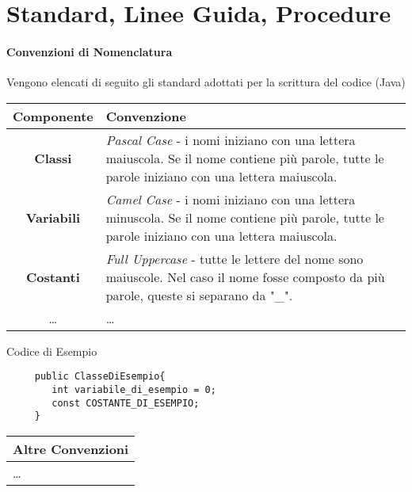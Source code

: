 \documentclass{article}
\begin{document}
\section{Standard, Linee Guida, Procedure}
\paragraph{Convenzioni di Nomenclatura}
Vengono elencati di seguito gli standard adottati per la scrittura del codice (Java)
\begin{center}
    \begin{longtable}{cp{200pt}}
        \toprule
        \textbf{Componente} & \textbf{Convenzione} \\
        \midrule
        \textbf{Classi} & \textit{Pascal Case} -  i nomi iniziano con una lettera maiuscola. Se il nome contiene più parole, tutte le parole iniziano con una lettera maiuscola. \\
        \textbf{Variabili} & \textit{Camel Case} - i nomi iniziano con una lettera minuscola. Se il nome contiene più parole, tutte le parole iniziano con una lettera maiuscola.  \\
        \textbf{Costanti} & \textit{Full Uppercase} - tutte le lettere del nome sono maiuscole. Nel caso il nome fosse composto da più parole, queste si separano da "\_". \\
        \dots & \dots \\
        \bottomrule
    \end{longtable}
\end{center}

\begin{code*}{Codice di Esempio}{}

\begin{verbatim}
     public ClasseDiEsempio{
        int variabile_di_esempio = 0;
        const COSTANTE_DI_ESEMPIO;
     }
\end{verbatim}
 
\end{code*}

\begin{center}
    \begin{longtable}{p{260pt}}
        \toprule
        \textbf{Altre Convenzioni} \\
        \midrule
        
        \dots \\
        \bottomrule
    \end{longtable}
\end{center}
\end{document}
